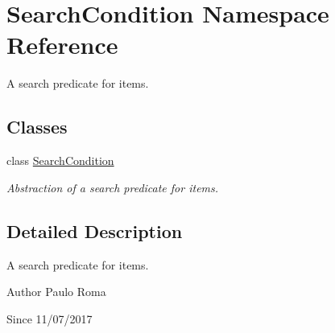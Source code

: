\hypertarget{namespaceSearchCondition}{}\section{Search\+Condition Namespace Reference}
\label{namespaceSearchCondition}


A search predicate for items.  


\subsection*{Classes}
\begin{DoxyCompactItemize}
\item 
class \hyperlink{classSearchCondition_1_1SearchCondition}{Search\+Condition}
\begin{DoxyCompactList}\small\item\em Abstraction of a search predicate for items. \end{DoxyCompactList}\end{DoxyCompactItemize}


\subsection{Detailed Description}
A search predicate for items. 

\begin{DoxyAuthor}{Author}
Paulo Roma 
\end{DoxyAuthor}
\begin{DoxySince}{Since}
11/07/2017 
\end{DoxySince}
